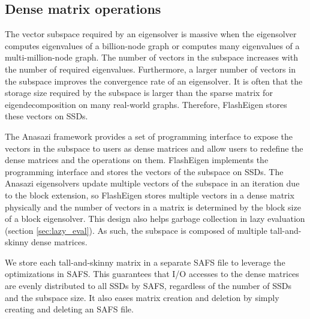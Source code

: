 \subsection{Dense matrix operations}
The vector subspace required by an eigensolver is massive when the eigensolver
computes eigenvalues of a billion-node graph or computes many eigenvalues
of a multi-million-node graph. The number of vectors in the subspace
increases with the number of required eigenvalues. Furthermore, a larger
number of vectors in the subspace improves the convergence rate of an eigensolver. 
It is often that the storage size required by the subspace is larger than
the sparse matrix for eigendecomposition on many real-world graphs. Therefore,
FlashEigen stores these vectors on SSDs.

The Anasazi framework provides a set of programming interface to expose
the vectors in the subspace to users as dense matrices and allow users to
redefine the dense matrices and the operations on them. FlashEigen implements
the programming interface and stores the vectors of the subspace on SSDs.
The Anasazi eigensolvers update multiple vectors of the subspace in an iteration
due to the block extension, so FlashEigen stores multiple vectors in a dense
matrix physically and the number of vectors in a matrix is determined by
the block size of a block eigensolver. This design also helps garbage
collection in lazy evaluation (section \ref{sec:lazy_eval}).
As such, the subspace is composed of multiple tall-and-skinny dense matrices.

We store each tall-and-skinny matrix in a separate SAFS file to leverage
the optimizations in SAFS. This guarantees that I/O accesses to the dense
matrices are evenly distributed to all SSDs by SAFS, regardless of the number of
SSDs and the subspace size. It also eases matrix creation and deletion by
simply creating and deleting an SAFS file.

